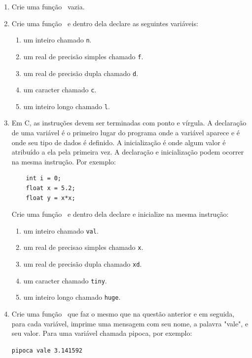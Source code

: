 \begin{enumerate}

  \item Crie uma função \MAIN\ vazia.

  \item Crie uma função \MAIN\ e dentro dela declare as seguintes variáveis:
    \begin{enumerate}
      \item um inteiro chamado {\tt n}.
      \item um real de precisão simples chamado {\tt f}.
      \item um real de precisão dupla chamado {\tt d}.
      \item um caracter chamado {\tt c}.
      \item um inteiro longo chamado {\tt l}.
     \end{enumerate}
          
  \item Em C, as instruções devem ser terminadas com ponto e vírgula. A declaração de uma variável é o primeiro lugar do programa onde a variável aparece e é onde seu tipo de dados é definido. A inicialização é onde algum valor é atribuído a ela pela primeira vez. A declaração e inicialização podem ocorrer na mesma instrução. Por exemplo:
\begin{lstlisting}
	int i = 0;
	float x = 5.2;
	float y = x*x;
\end{lstlisting}

Crie uma função \MAIN\ e dentro dela declare e inicialize na mesma instrução:
    \begin{enumerate}
      \item um inteiro chamado {\tt val}.
      \item um real de precisao simples chamado {\tt x}.
      \item um real de precisão dupla chamado {\tt xd}.
      \item um caracter chamado {\tt tiny}.
      \item um inteiro longo chamado {\tt huge}.
    \end{enumerate}

  \item Crie uma função \MAIN\ que faz o mesmo que na questão anterior e em seguida, para cada variável, imprime uma mensagem com seu nome, a palavra "vale", e seu valor. Para uma variável chamada pipoca, por exemplo:

	{\tt pipoca vale 3.141592}


\end{enumerate}
